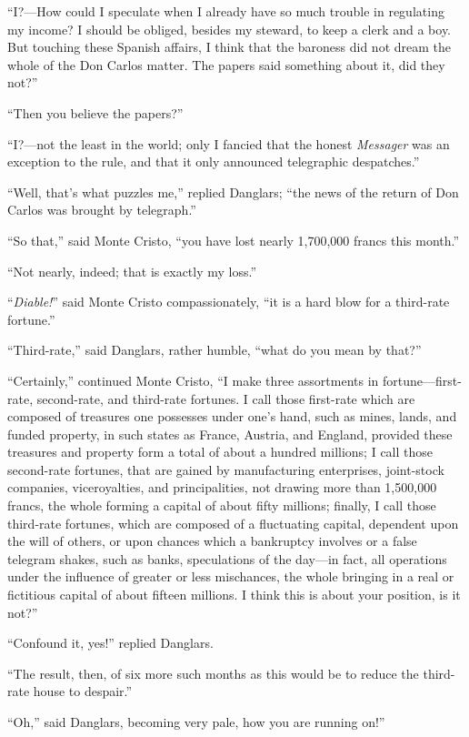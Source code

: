 “I?—How could I speculate when I already have so much trouble in
regulating my income? I should be obliged, besides my steward, to keep
a clerk and a boy. But touching these Spanish affairs, I think that the
baroness did not dream the whole of the Don Carlos matter. The papers
said something about it, did they not?”

“Then you believe the papers?”

“I?—not the least in the world; only I fancied that the honest
\textit{Messager} was an exception to the rule, and that it only announced
telegraphic despatches.”

“Well, that’s what puzzles me,” replied Danglars; “the news of the
return of Don Carlos was brought by telegraph.”

“So that,” said Monte Cristo, “you have lost nearly 1,700,000 francs
this month.”

“Not nearly, indeed; that is exactly my loss.”

“\textit{Diable!}” said Monte Cristo compassionately, “it is a hard blow for a
third-rate fortune.”

“Third-rate,” said Danglars, rather humble, “what do you mean by that?”

“Certainly,” continued Monte Cristo, “I make three assortments in
fortune—first-rate, second-rate, and third-rate fortunes. I call those
first-rate which are composed of treasures one possesses under one’s
hand, such as mines, lands, and funded property, in such states as
France, Austria, and England, provided these treasures and property
form a total of about a hundred millions; I call those second-rate
fortunes, that are gained by manufacturing enterprises, joint-stock
companies, viceroyalties, and principalities, not drawing more than
1,500,000 francs, the whole forming a capital of about fifty millions;
finally, I call those third-rate fortunes, which are composed of a
fluctuating capital, dependent upon the will of others, or upon chances
which a bankruptcy involves or a false telegram shakes, such as banks,
speculations of the day—in fact, all operations under the influence of
greater or less mischances, the whole bringing in a real or fictitious
capital of about fifteen millions. I think this is about your position,
is it not?”

“Confound it, yes!” replied Danglars.

“The result, then, of six more such months as this would be to reduce
the third-rate house to despair.”

“Oh,” said Danglars, becoming very pale, how you are running on!”

